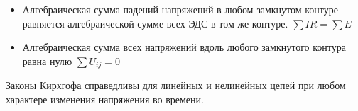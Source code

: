 \begin{itemize}
\item
	Алгебраическая сумма падений напряжений в любом замкнутом контуре равняется алгебраической сумме всех ЭДС в том же контуре.
	$\sum I R = \sum E $
\item
	Алгебраическая сумма всех напряжений вдоль любого замкнутого контура равна нулю
	$\sum U_{ij} = 0 $
\end{itemize}

Законы Кирхгофа справедливы для линейных  и нелинейных цепей при любом характере изменения напряжения во времени.

\pagebreak
